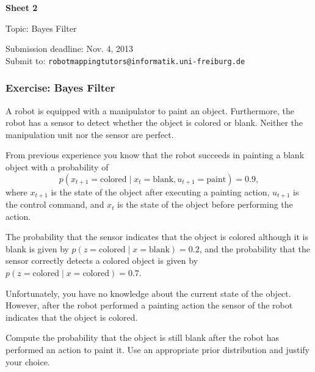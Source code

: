 \documentclass[12pt,a4paper]{article}
\begin{document}


\begin{center}
{\bf \Large Sheet 2}

{\large Topic: Bayes Filter}

Submission deadline: Nov. 4, 2013\\
Submit to: \texttt{robotmappingtutors@informatik.uni-freiburg.de}
\end{center}

\subsubsection*{Exercise: Bayes Filter}

A robot is equipped with a manipulator to paint an object.  Furthermore,
the robot has a sensor to detect whether the object is colored or blank.
Neither the manipulation unit nor the sensor are perfect.

From previous experience you know that the robot succeeds in painting a
blank object with a probability of
\begin{equation*}
p( x_{t+1} = \text{colored} \mid x_t = \text{blank}, u_{t+1} = \text{paint} ) = 0.9,
\end{equation*}
where $x_{t+1}$ is the state of the object after executing a painting action,
$u_{t+1}$ is the control command, and $x_t$ is the state of the object
before performing the action.

The probability that the sensor indicates that the object is colored
although it is blank is given by $p(z=\text{colored} \mid
x=\text{blank}) = 0.2$, and the probability that the sensor correctly
detects a colored object is given by $p(z=\text{colored} \mid x =
\text{colored}) = 0.7$.

Unfortunately, you have no knowledge about the current state of the
object. However, after the robot performed a painting action the sensor
of the robot indicates that the object is colored.

Compute the probability that the object is still blank after the robot
has performed an action to paint it. Use an appropriate prior
distribution and justify your choice.
\end{document}
